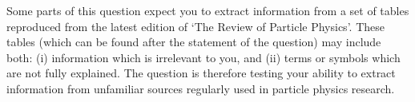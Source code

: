 Some parts of this question expect you to extract information from a  set of tables reproduced from the latest edition of `The Review of Particle Physics'.
These tables (which can be found after the statement of the question) may include both: (i) information which is irrelevant to you, and (ii) terms or symbols which are not fully explained.  The question is therefore testing your ability to extract information from unfamiliar  sources regularly used in particle physics research.
